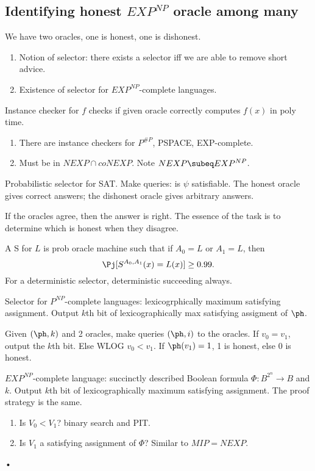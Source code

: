 \subsection{Identifying honest $EXP^{NP}$ oracle among many}


We have two oracles, one is honest, one is dishonest. 

\begin{enumerate}
\item
Notion of selector: there exists a selector iff we are able to remove short advice.
\item
Existence of selector for $EXP^{NP}$-complete languages.
\end{enumerate}

Instance checker for $f$ checks if given oracle correctly computes $f(x)$ in poly time.
\begin{enumerate}
\item
There are instance checkers for $P^{\#P}$, PSPACE, EXP-complete.
\item Must be in $NEXP\cap coNEXP$. Note $NEXP\subeq EXP^{NP}$.
\end{enumerate}

Probabilistic selector for SAT. Make queries: is $\psi$ satisfiable. The honest oracle gives correct answers; the dishonest oracle gives arbitrary answers.

If the oracles agree, then the answer is right. The essence of the task is to determine which is honest when they disagree.
\begin{df}
A  S for $L$ is prob oracle machine such that if $A_0=L$ or $A_1=L$, then
\[
\Pj[S^{A_0,A_1}(x)=L(x)]\ge 0.99.
\]
For a deterministic selector, deterministic succeeding always.
\end{df}

Selector for $P^{NP}$-complete languages: lexicogrphically maximum satisfying assignment. Output $k$th bit of lexicographically max satisfying assigment of $\ph$.

Given $(\ph,k)$ and 2 oracles, make queries $(\ph,i)$ to the oracles. If $v_0=v_1$, output the $k$th bit. Else WLOG $v_0<v_1$. If $\ph(v_1)=1$, 1 is honest, else 0 is honest.

$EXP^{NP}$-complete language: succinctly described Boolean formula $\Phi:B^{2^n}\to B$ and $k$. Output $k$th bit of lexicographically maximum satisfying assignment. The proof strategy is the same.

\begin{enumerate}
\item
Is $V_0<V_1$? binary search and PIT.
\item
Is $V_1$ a satisfying assignment of $\Phi$? Similar to $MIP=NEXP$.
\end{enumerate}•

